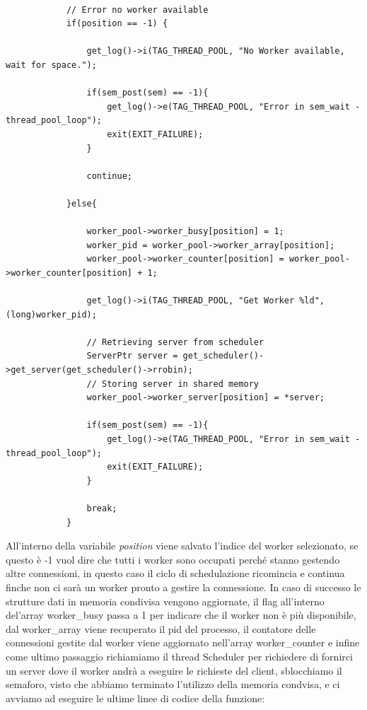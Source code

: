 \documentclass[italian]{tktltiki2}
\begin{document}
\begin{lstlisting}
	        
	        // Error no worker available
            if(position == -1) {
                
                get_log()->i(TAG_THREAD_POOL, "No Worker available, wait for space.");

                if(sem_post(sem) == -1){
                    get_log()->e(TAG_THREAD_POOL, "Error in sem_wait - thread_pool_loop");
                    exit(EXIT_FAILURE);
                }

                continue;
            
            }else{
                
                worker_pool->worker_busy[position] = 1;
                worker_pid = worker_pool->worker_array[position];
                worker_pool->worker_counter[position] = worker_pool->worker_counter[position] + 1;
                
                get_log()->i(TAG_THREAD_POOL, "Get Worker %ld", (long)worker_pid);

                // Retrieving server from scheduler
                ServerPtr server = get_scheduler()->get_server(get_scheduler()->rrobin);
                // Storing server in shared memory
                worker_pool->worker_server[position] = *server;
                
                if(sem_post(sem) == -1){
                    get_log()->e(TAG_THREAD_POOL, "Error in sem_wait - thread_pool_loop");
                    exit(EXIT_FAILURE);
                }

                break;
            }
\end{lstlisting}
All'interno della variabile \emph{position} viene salvato l'indice del worker selezionato, se questo è -1 vuol dire che tutti i worker sono occupati perché stanno gestendo altre connessioni, in questo caso il ciclo di schedulazione ricomincia e continua finche non ci sarà un worker pronto a gestire la connessione. In caso di successo le strutture dati in memoria condivisa vengono aggiornate, il flag all'interno del'array worker\_busy passa a 1 per indicare che il worker non è più disponibile, dal worker\_array viene recuperato il pid del processo, il contatore delle connessioni gestite dal worker viene aggiornato nell'array worker\_counter e infine come ultimo passaggio richiamiamo il thread Scheduler per richiedere di fornirci un server dove il worker andrà a eseguire le richieste del client, sblocchiamo il semaforo, visto che abbiamo terminato l'utilizzo della memoria condvisa, e ci avviamo ad eseguire le ultime linee di codice della funzione:
\end{document}

